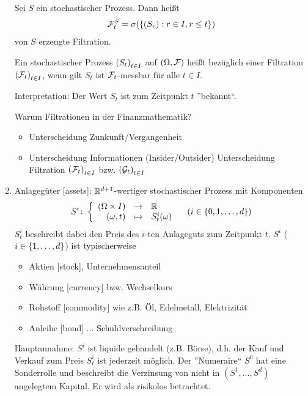 \begin{enumerate}[leftmargin=*]
	\begin{beispiel}
		Sei $S$ ein stochastischer Prozess. Dann heißt
		\begin{equation*}
			\mathcal{F}_t^S = \sigma( \left\{ (S_r) : r \in I, r \le t \right\} )
		\end{equation*}
		von $S$ erzeugte Filtration.
	\end{beispiel}
	
	\begin{definition}
		Ein stochastischer Prozess $\left( S_t \right)_{t \in I}$ auf $(\Omega, \mathcal{F})$ heißt  bezüglich einer Filtration $\left( \mathcal{F}_t \right)_{t \in I}$, wenn gilt $S_t$ ist $\mathcal{F}_t$-messbar für alle $t \in I$.
	\end{definition}
	
	Interpretation: Der Wert $S_t$ ist zum Zeitpunkt $t$ ''bekannt``.
	
	Warum Filtrationen in der Finanzmathematik?
	\begin{itemize}[nolistsep, topsep=-\parskip]
		\item Unterscheidung Zunkunft/Vergangenheit
		\item Unterscheidung Informationen (Insider/Outsider) Unterscheidung Filtration $\left( \mathcal{F}_t \right)_{t \in I}$ bzw. $\left( \mathcal{G}_t \right)_{t \in I}$
	\end{itemize}
	
	\item Anlagegüter [assets]: $\mathbb{R}^{d+1}$-wertiger stochastischer Prozess mit Komponenten
	\begin{equation*}
		S^i \colon \left\lbrace \begin{array}{rcl} (\Omega \times I) & \to & \mathbb{R} \\(\omega, t) & \mapsto & S_t^i(\omega) \end{array} \right. \quad (i \in \left\{ 0, 1, \dots , d \right\})
	\end{equation*}
	$S_t^i$ beschreibt dabei den Preis des $i$-ten Anlageguts zum Zeitpunkt $t$. $S^i$ ($i \in \left\{ 1, \dots , d \right\}$) ist typischerweise
	\begin{itemize}[nolistsep, topsep=-\parskip]
		\item Aktien [stock], Unternehmensanteil
		\item Währung [currency] bzw. Wechselkurs
		\item Rohstoff [commodity] wie z.B. Öl, Edelmetall, Elektrizität
		\item Anleihe [bond] $\dots$ Schuldverschreibung
	\end{itemize}
	
	Hauptannahme: $S^i$ ist liquide gehandelt (z.B. Börse), d.h. der Kauf und Verkauf zum Preis $S_t^i$ ist jederzeit möglich. 
	Der ''Numeraire`` $S^0$ hat eine Sonderrolle und beschreibt die Verzinsung von nicht in $(S^1, \dots , S^d)$ angelegtem Kapital. Er wird als risikolos betrachtet.
\end{enumerate}

